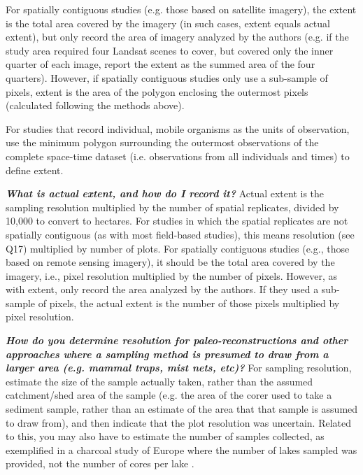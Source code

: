 \documentclass[12pt]{article}
\begin{document}
\begin{enumerate}
For spatially contiguous studies (e.g. those based on satellite imagery), the extent is the total area covered by the imagery (in such cases, extent equals actual extent), but only record the area of imagery analyzed by the authors (e.g. if the study area required four Landsat scenes to cover, but covered only the inner quarter of each image, report the extent as the summed area of the four quarters). However, if spatially contiguous studies only use a sub-sample of pixels, extent is the area of the polygon enclosing the outermost pixels (calculated following the methods above).

For studies that record individual, mobile organisms as the units of observation, use the minimum polygon surrounding the outermost observations of the complete space-time dataset (i.e. observations from all individuals and times) to define extent.

  \Hitem \emph{\textbf{What is \emph{actual extent}, and how do I record it?}}  Actual extent is the sampling resolution multiplied by the number of spatial replicates, divided by 10,000 to convert to hectares. For studies in which the spatial replicates are not spatially contiguous (as with most field-based studies), this means resolution (see Q17) multiplied by number of plots. For spatially contiguous studies (e.g., those based on remote sensing imagery), it should be the total area covered by the imagery, i.e., pixel resolution multiplied by the number of pixels. However, as with extent, only record the area analyzed by the authors. If they used a sub-sample of pixels, the actual extent is the number of those pixels multiplied by pixel resolution. 
  
    \Hitem \emph{\textbf{How do you determine resolution for paleo-reconstructions and other approaches where a sampling method is presumed to draw from a larger area (e.g. mammal traps, mist nets, etc)?}}  For sampling resolution, estimate the size of the sample actually taken, rather than the assumed catchment/shed area of the sample (e.g. the area of the corer used to take a sediment sample, rather than an estimate of the area that that sample is assumed to draw from), and then indicate that the plot resolution was uncertain. Related to this, you may also have to estimate the number of samples collected, as exemplified in a charcoal study of Europe where the number of lakes sampled was provided, not the number of cores per lake \cite{molinari_exploring_2013}.  


\end{enumerate}
\end{document}
